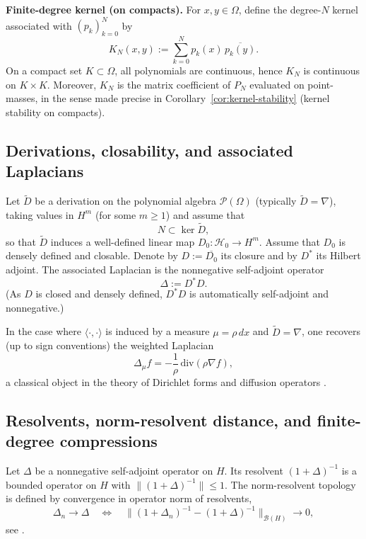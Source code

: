 \documentclass{amsart}
\numberwithin{equation}{section}
\theoremstyle{definition}
\theoremstyle{remark}
\begin{document}
\medskip
\noindent\textbf{Finite-degree kernel (on compacts).}
For $x,y\in\Omega$, define the degree-$N$ kernel associated with $(p_k)_{k=0}^N$ by
\begin{equation}\label{eq:kernel-def}
K_N(x,y):=\sum_{k=0}^N p_k(x)\,\overline{p_k(y)}.
\end{equation}
On a compact set $K\subset\Omega$, all polynomials are continuous, hence $K_N$ is continuous on $K\times K$.
Moreover, $K_N$ is the matrix coefficient of $P_N$ evaluated on point-masses, in the sense made precise
in Corollary~\ref{cor:kernel-stability} (kernel stability on compacts).

\subsection{Derivations, closability, and associated Laplacians}

Let $\widetilde D$ be a derivation on the polynomial algebra $\mathcal P(\Omega)$ (typically $\widetilde D=\nabla$),
taking values in $H^m$ (for some $m\ge 1$) and assume that
\begin{equation}\label{eq:N-kernel-D}
N\subset\ker \widetilde D,
\end{equation}
so that $\widetilde D$ induces a well-defined linear map $D_0:\mathcal H_0\to H^m$.
Assume that $D_0$ is densely defined and closable. Denote by $D:=\overline{D_0}$ its closure and by $D^*$
its Hilbert adjoint. The associated Laplacian is the nonnegative self-adjoint operator
\begin{equation}\label{eq:Laplacian-def}
\Delta:=D^*D.
\end{equation}
(As $D$ is closed and densely defined, $D^*D$ is automatically self-adjoint and nonnegative.)

In the case where $\langle\cdot,\cdot\rangle$ is induced by a measure $\mu=\rho\,dx$ and $\widetilde D=\nabla$,
one recovers (up to sign conventions) the weighted Laplacian
\[
\Delta_\mu f=-\frac{1}{\rho}\,\mathrm{div}(\rho\nabla f),
\]
a classical object in the theory of Dirichlet forms and diffusion operators \cite{Fukushima,Ouhabaz}.

\subsection{Resolvents, norm-resolvent distance, and finite-degree compressions}

Let $\Delta$ be a nonnegative self-adjoint operator on $H$.
Its resolvent $(1+\Delta)^{-1}$ is a bounded operator on $H$ with $\|(1+\Delta)^{-1}\|\le 1$.
The norm-resolvent topology is defined by convergence in operator norm of resolvents,
\[
\Delta_n\to\Delta\quad\Longleftrightarrow\quad
\|(1+\Delta_n)^{-1}-(1+\Delta)^{-1}\|_{\mathcal B(H)}\to 0,
\]
see \cite{Kato,ReedSimon1}.
\end{document}
